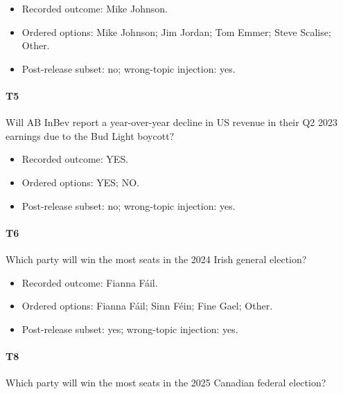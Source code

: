 \begin{itemize}

\item Recorded outcome: Mike Johnson.

\item Ordered options: Mike Johnson; Jim Jordan; Tom Emmer; Steve Scalise; Other.

\item Post-release subset: no; wrong-topic injection: yes.

\end{itemize}

\paragraph*{T5} Will AB InBev report a year-over-year decline in US revenue in their Q2 2023 earnings due to the Bud Light boycott?

\begin{itemize}

\item Recorded outcome: YES.

\item Ordered options: YES; NO.

\item Post-release subset: no; wrong-topic injection: yes.

\end{itemize}

\paragraph*{T6} Which party will win the most seats in the 2024 Irish general election?

\begin{itemize}

\item Recorded outcome: Fianna Fáil.

\item Ordered options: Fianna Fáil; Sinn Féin; Fine Gael; Other.

\item Post-release subset: yes; wrong-topic injection: yes.

\end{itemize}

\paragraph*{T8} Which party will win the most seats in the 2025 Canadian federal election?

